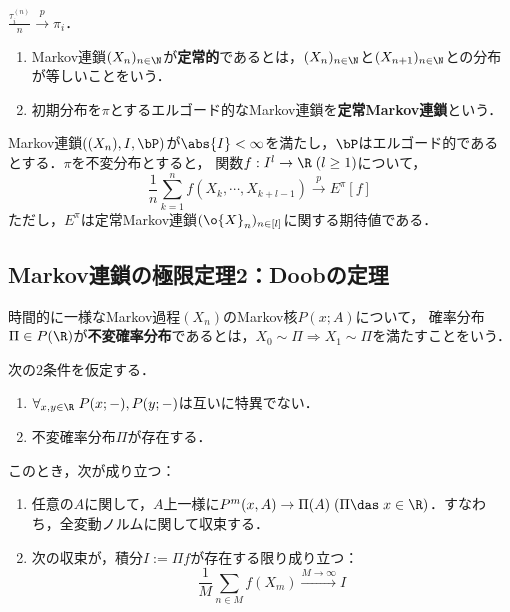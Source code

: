 \documentclass[uplatex,dvipdfmx]{jsreport}
\begin{document}
\begin{corollary}
    $\frac{\tau_i^{(n)}}{n}\xrightarrow{p}\pi_i$．
\end{corollary}

\begin{definition}[stationarity]\mbox{}
    \begin{enumerate}
        \item Markov連鎖$(X_n)_{n\in\N}$が\textbf{定常的}であるとは，$(X_n)_{n\in\N}$と$(X_{n+1})_{n\in\N}$との分布が等しいことをいう．
        \item 初期分布を$\pi$とするエルゴード的なMarkov連鎖を\textbf{定常Markov連鎖}という．
    \end{enumerate}
\end{definition}

\begin{theorem}[高次元化]
    Markov連鎖$((X_n),I,\bP)$が$\abs{I}<\infty$を満たし，$\bP$はエルゴード的であるとする．$\pi$を不変分布とすると，
    関数$f:I^l\to\R\;(l\ge1)$について，
    \[\frac{1}{n}\sum_{k=1}^nf(X_k,\cdots,X_{k+l-1})\xrightarrow{p}E^\pi[f]\]
    ただし，$E^\pi$は定常Markov連鎖$(\o{X}_n)_{n\in[l]}$に関する期待値である．
\end{theorem}

\subsection{Markov連鎖の極限定理2：Doobの定理}

\begin{definition}
    時間的に一様なMarkov過程$(X_n)$のMarkov核$P(x;A)$について，
    確率分布$\Pi\in P(\R)$が\textbf{不変確率分布}であるとは，$X_0\sim\Pi\Rightarrow X_1\sim\Pi$を満たすことをいう．
\end{definition}

\begin{theorem}[Doob]
    次の2条件を仮定する．
    \begin{enumerate}[({A}1)]
        \item $\forall_{x,y\in\R}\;P(x;-),P(y;-)$は互いに特異でない．
        \item 不変確率分布$\Pi$が存在する．
    \end{enumerate}
    このとき，次が成り立つ：
    \begin{enumerate}
        \item 任意の$A$に関して，$A$上一様に$P^m(x,A)\to\Pi(A)\;(\Pi\das\;x\in\R)$．すなわち，全変動ノルムに関して収束する．
        \item 次の収束が，積分$I:=\Pi f$が存在する限り成り立つ：
        \[\frac{1}{M}\sum_{n\in M}f(X_m)\xrightarrow{M\to\infty} I\]
    \end{enumerate}
\end{theorem}
\end{document}
